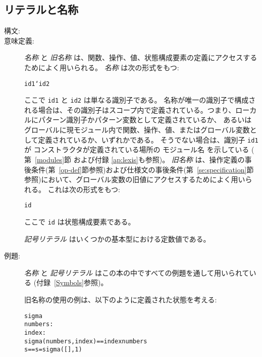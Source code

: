 \documentclass[\pformat,12pt]{jarticle}
\begin{document}
\subsection{リテラルと名称}

\begin{description}
\item[構文:]




\item[意味定義:] {\it 名称\/} と {\it 旧名称\/} は、関数、操作、値、状態構成要素の定義にアクセスするためによく用いられる。
 {\it 名称\/} は次の形式をもつ:
  \begin{alltt}
    id1`id2
  \end{alltt}
ここで {\tt id1} と {\tt id2} は単なる識別子である。
名称が唯一の識別子で構成される場合は、その識別子はスコープ内で定義されている。つまり、ローカルにパターン識別子かパターン変数として定義されているか、
あるいはグローバルに現モジュール内で関数、操作、値、またはグローバル変数として定義されているか、いずれかである。
そうでない場合は、識別子 {\tt id1}が
コンストラクタが定義されている場所の
モジュール名
を示している (
  第~\ref{modules}節
および付録 \ref{ap:lexis}も参照)。
 {\it 旧名称\/} は、操作定義の事後条件(第~\ref{op-def}節参照)および仕様文の事後条件(第~\ref{se:specification}節参照)において、グローバル変数の旧値にアクセスするためによく用いられる。
これは次の形式をもつ:

  \begin{alltt} 
    id~ 
  \end{alltt} 
 ここで {\tt id} は状態構成要素である。

  {\it 記号リテラル\/} はいくつかの基本型における定数値である。

\item[例題:] {\it 名称} と {\it 記号リテラル\/} はこの本の中ですべての例題を通して用いられている (付録~\ref{Symbols}参照)。


  旧名称の使用の例は、以下のように定義された状態を考える:
  \begin{alltt}
     sigma 
      numbers : 
      index   : 
      sigma(numbers, index) == index  numbers
     s == s = sigma([], 1)
  \end{alltt}


\end{description}
\end{document}

